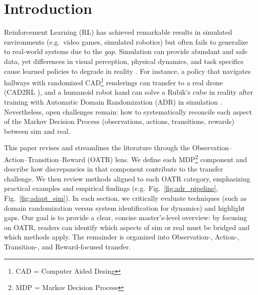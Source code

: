 \section{Introduction}
Reinforcement Learning (RL) has achieved remarkable results in simulated environments (e.g.\ video games, simulated robotics) but often fails to generalize to real-world systems due to the \emph{\simtoreal gap}. Simulation can provide abundant and safe data, yet differences in visual perception, physical dynamics, and task specifics cause learned policies to degrade in reality {\cite{Tobin2017,Sadeghi2017}}. For instance, a policy that navigates hallways with randomized CAD\footnote{CAD = Computer Aided Desing} renderings can transfer to a real drone (CAD2RL {\cite{Sadeghi2017}}), and a humanoid robot hand can solve a Rubik’s cube in reality after training with Automatic Domain Randomization (ADR) in simulation {\cite{Akkaya2019}}. Nevertheless, open challenges remain: how to systematically reconcile each aspect of the Markov Decision Process (observations, actions, transitions, rewards) between sim and real. 

This paper revises and streamlines the literature through the Observation–Action–Transition–Reward (OATR) lens. We define each MDP\footnote{MDP = Markov Decision Process} component and describe how discrepancies in that component contribute to the transfer challenge. We then review \simtoreal methods aligned to each OATR category, emphasizing practical examples and empirical findings (e.g.\ Fig.~\ref{fig:adr_pipeline}, Fig.~\ref{fig:adapt_sim}). In each section, we critically evaluate techniques (such as domain randomization versus system identification for dynamics) and highlight gaps. Our goal is to provide a clear, concise master’s-level overview: by focusing on OATR, readers can identify which aspects of sim or real must be bridged and which methods apply. The remainder is organized into Observation-, Action-, Transition-, and Reward-focused transfer.
